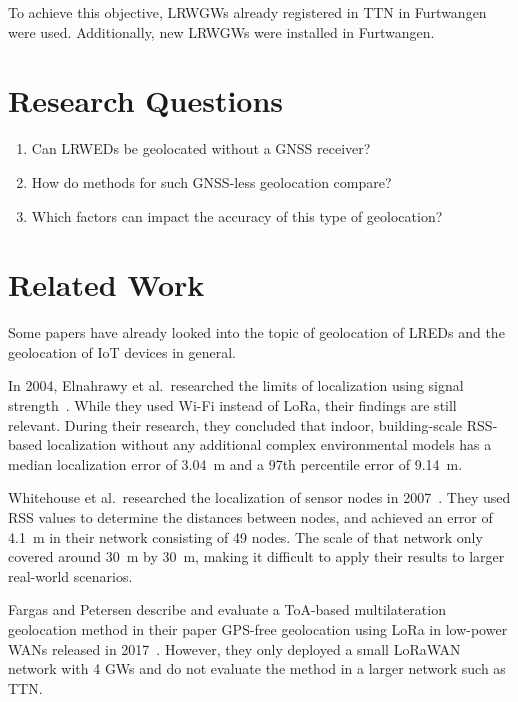 To achieve this objective, \aclp{LRWGW} already registered in \acf{TTN} in Furtwangen were used.
Additionally, new \aclp{LRWGW} were installed in Furtwangen.

\section{Research Questions}\label{sec:introduction-research-questions}

\begin{enumerate}
      \item Can \aclp{LRWED} be geolocated without a \ac{GNSS} receiver?
      \item How do methods for such \ac{GNSS}-less geolocation compare?
      \item Which factors can impact the accuracy of this type of geolocation?
\end{enumerate}

\section{Related Work}\label{sec:related-work}

Some papers have already looked into the topic of geolocation of \aclp{LRED} and the geolocation of \ac{IoT} devices in general.

In 2004, Elnahrawy et al.\ researched the limits of localization using signal strength~\cite{elnahrawy_limits_2004}.
While they used Wi-Fi instead of \ac{LoRa}, their findings are still relevant.
During their research, they concluded that indoor, building-scale \ac{RSS}-based localization without any additional complex environmental models has a median localization error of \SI{3.04}{\meter} and a 97th percentile error of \SI{9.14}{\meter}.

Whitehouse et al.\ researched the localization of sensor nodes in 2007~\cite{whitehouse_practical_2007}.
They used \ac{RSS} values to determine the distances between nodes, and achieved an error of \SI{4.1}{\meter} in their network consisting of 49 nodes.
The scale of that network only covered around \SI{30}{\meter} by \SI{30}{\meter}, making it difficult to apply their results to larger real-world scenarios.

Fargas and Petersen describe and evaluate a \ac{ToA}-based multilateration geolocation method in their paper \acs{GPS}-free geolocation using \acs{LoRa} in low-power \acsp{WAN} released in 2017~\cite{fargas_gps-free_2017}.
However, they only deployed a small \ac{LoRaWAN} network with 4 \aclp{GW} and do not evaluate the method in a larger network such as \ac{TTN}.

